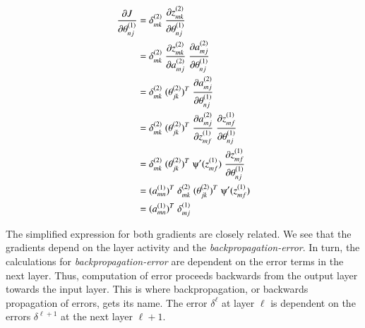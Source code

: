 \begin{equation*}
\begin{split}
\frac{\partial J}{\partial \theta_{nj}^{(1)}} & = \delta_{mk}^{(2)} \; \frac{\partial z_{mk}^{(2)}}{\partial \theta_{nj}^{(1)}} \\
 & = \delta_{mk}^{(2)} \; \frac{\partial z_{mk}^{(2)}}{\partial a_{mj}^{(2)}} \; \frac{\partial a_{mj}^{(2)}}{\partial \theta_{nj}^{(1)}}\\
& = \delta_{mk}^{(2)} \; (\theta_{jk}^{(2)})^{T} \; \frac{\partial a_{mj}^{(2)}}{\partial \theta_{nj}^{(1)}}\\
& = \delta_{mk}^{(2)} \; (\theta_{jk}^{(2)})^{T} \; \frac{\partial a_{mj}^{(2)}}{\partial z_{mf}^{(1)}} \; \frac{\partial z_{mf}^{(1)}}{\partial \theta_{nj}^{(1)}}\\
& = \delta_{mk}^{(2)} \; (\theta_{jk}^{(2)})^{T} \; \psiup'(z_{mf}^{(1)}) \; \frac{\partial z_{mf}^{(1)}}{\partial \theta_{nj}^{(1)}}\\
& = (a_{mn}^{(1)})^{T} \; \delta_{mk}^{(2)} \; (\theta_{jk}^{(2)})^{T} \; \psiup'(z_{mf}^{(1)})\\
& = (a_{mn}^{(1)})^{T} \; \delta_{mj}^{(1)}
\end{split}
\end{equation*}

\noindent
The simplified expression for both gradients are closely related. We see that the gradients depend on the layer activity and the \textit{backpropagation-error}. In turn, the calculations for \textit{backpropagation-error} are dependent on the error terms in the next layer. Thus, computation of error proceeds backwards from the output layer towards the input layer. This is where backpropagation, or backwards propagation of errors, gets its name. The error $\delta^{\ell}$ at layer $\ell$ is dependent on the errors $\delta^{\ell+1}$ at the next layer $\ell + 1$. 



